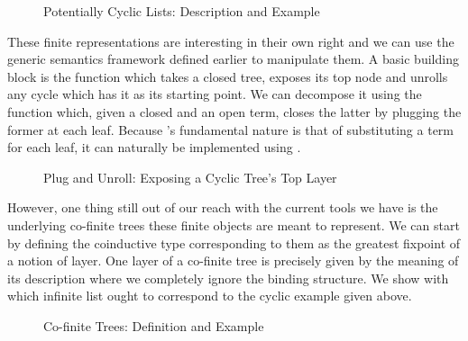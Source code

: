 \begin{figure}[h]
\begin{minipage}{0.45\textwidth}
\end{minipage}\hspace{2em}
\begin{minipage}{0.45\textwidth}
\end{minipage}
\caption{Potentially Cyclic Lists: Description and Example}
\end{figure}

These finite representations are interesting in their own right
and we can use the generic semantics framework defined earlier
to manipulate them. A basic building block is the 
function which takes a closed tree, exposes its top node and
unrolls any cycle which has it as its starting point. We can
decompose it using the  function which, given a closed
and an open term, closes the latter by plugging the former at
each  leaf. Because 's fundamental nature
is that of substituting a term for each leaf, it can naturally
be implemented using .

\begin{figure}[h]
\begin{minipage}{0.52\textwidth}
\end{minipage}\hspace{2em}
\begin{minipage}{0.43\textwidth}
\end{minipage}
\caption{Plug and Unroll: Exposing a Cyclic Tree's Top Layer}
\end{figure}

However, one thing still out of our reach with the current tools we have
is the underlying co-finite trees these finite objects are meant
to represent. We can start by defining the coinductive type
corresponding to them as the greatest fixpoint of a notion of
layer. One layer of a co-finite tree is precisely given by the
meaning of its description where we completely ignore the binding
structure. We show with  which infinite list ought to
correspond to the cyclic example  given above.

\begin{figure}[h]
\begin{minipage}{0.55\textwidth}
\end{minipage}\hspace{2em}
\begin{minipage}{0.35\textwidth}
\end{minipage}
\caption{Co-finite Trees: Definition and Example}
\end{figure}

